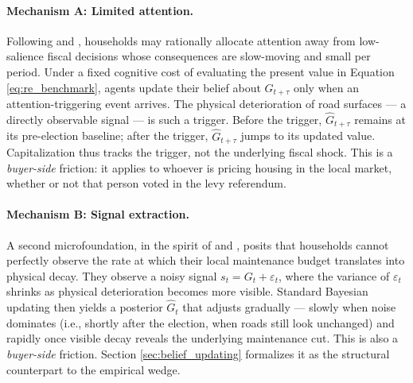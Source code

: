 \paragraph{Mechanism A: Limited attention.}
Following \citet{chetty2009salience} and \citet{finkelstein2009eztax}, households may rationally allocate attention away from low-salience fiscal decisions whose consequences are slow-moving and small per period. Under a fixed cognitive cost of evaluating the present value in Equation \ref{eq:re_benchmark}, agents update their belief about $G_{t+\tau}$ only when an attention-triggering event arrives. The physical deterioration of road surfaces --- a directly observable signal --- is such a trigger. Before the trigger, $\hat{G}_{t+\tau}$ remains at its pre-election baseline; after the trigger, $\hat{G}_{t+\tau}$ jumps to its updated value. Capitalization thus tracks the trigger, not the underlying fiscal shock. This is a {\it buyer-side} friction: it applies to whoever is pricing housing in the local market, whether or not that person voted in the levy referendum.

\paragraph{Mechanism B: Signal extraction.}
A second microfoundation, in the spirit of \citet{ouazad2024frictions} and \citet{bakkensen2022underwater}, posits that households cannot perfectly observe the rate at which their local maintenance budget translates into physical decay. They observe a noisy signal $s_t = G_t + \varepsilon_t$, where the variance of $\varepsilon_t$ shrinks as physical deterioration becomes more visible. Standard Bayesian updating then yields a posterior $\hat{G}_t$ that adjusts gradually --- slowly when noise dominates (i.e., shortly after the election, when roads still look unchanged) and rapidly once visible decay reveals the underlying maintenance cut. This is also a {\it buyer-side} friction. Section \ref{sec:belief_updating} formalizes it as the structural counterpart to the empirical wedge.


